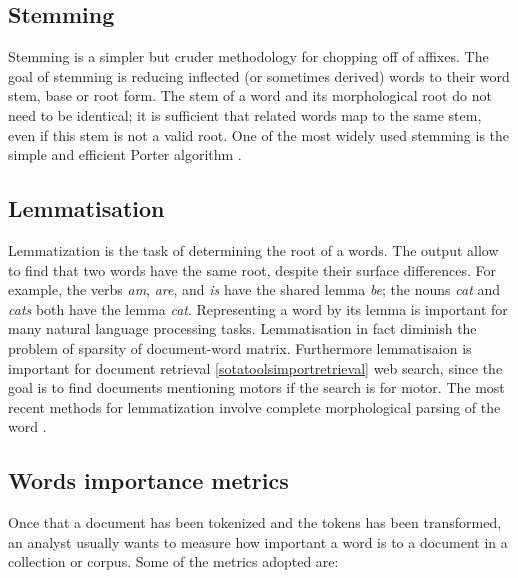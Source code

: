 \documentclass[]{book}
\begin{document}
\subsection{Stemming}\label{sotatoolstransformstemming}

Stemming is a simpler but cruder methodology for chopping off of
affixes. The goal of stemming is reducing inflected (or sometimes
derived) words to their word stem, base or root form. The stem of a word
and its morphological root do not need to be identical; it is sufficient
that related words map to the same stem, even if this stem is not a
valid root. One of the most widely used stemming is the simple and
efficient Porter algorithm \citep{porter1980algorithm}.

\subsection{Lemmatisation}\label{sotatoolstransformlemmatisation}

Lemmatization is the task of determining the root of a words. The output
allow to find that two words have the same root, despite their surface
differences. For example, the verbs \emph{am}, \emph{are}, and \emph{is}
have the shared lemma \emph{be}; the nouns \emph{cat} and \emph{cats}
both have the lemma \emph{cat}. Representing a word by its lemma is
important for many natural language processing tasks. Lemmatisation in
fact diminish the problem of sparsity of document-word matrix.
Furthermore lemmatisaion is important for document retrieval
\ref{sotatoolsimportretrieval} web search, since the goal is to find
documents mentioning motors if the search is for motor. The most recent
methods for lemmatization involve complete morphological parsing of the
word \citep{hankamer1989morphological}.

\subsection{Words importance metrics}\label{sotatoolstransformwi}

Once that a document has been tokenized and the tokens has been
transformed, an analyst usually wants to measure how important a word is
to a document in a collection or corpus. Some of the metrics adopted
are:
\end{document}
